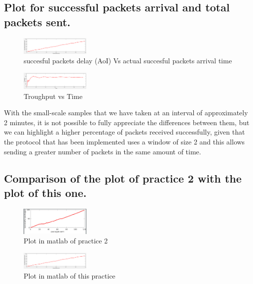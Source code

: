 \documentclass[journal,trans]{IEEEtran}
\begin{document}
\subsection{\textbf{Plot for successful packets arrival and total packets sent.}}
\begin{figure}[h]
    \includegraphics[width=0.3\textwidth]{plot1.PNG}
    \centering
    \caption{succesful packets delay (AoI) Vs actual succesful packets arrival time}
    \label{fig:my_label6}
\end{figure}

\begin{figure}[h]
    \includegraphics[width=0.3\textwidth]{plot2.PNG}
    \centering
    \caption{Troughput vs Time}
    \label{fig:my_label6}
\end{figure}
With the small-scale samples that we have taken at an interval of approximately 2 minutes, it is not possible to fully appreciate the differences between them, but we can highlight a higher percentage of packets received successfully, given that the protocol that has been implemented uses a window of size 2 and this allows sending a greater number of packets in the same amount of time.
\subsection{\textbf{Comparison of the plot of practice 2 with the plot of this one.}}
\begin{figure}[h]
    \includegraphics[width=0.3\textwidth]{gra.png}
    \centering
    \caption{Plot in matlab of practice 2}
    \label{fig:my_label6}
\end{figure}

\begin{figure}[h]
    \includegraphics[width=0.3\textwidth]{plot1.PNG}
    \centering
    \caption{Plot in matlab of this practice}
    \label{fig:my_label6}
\end{figure}
\end{document}
